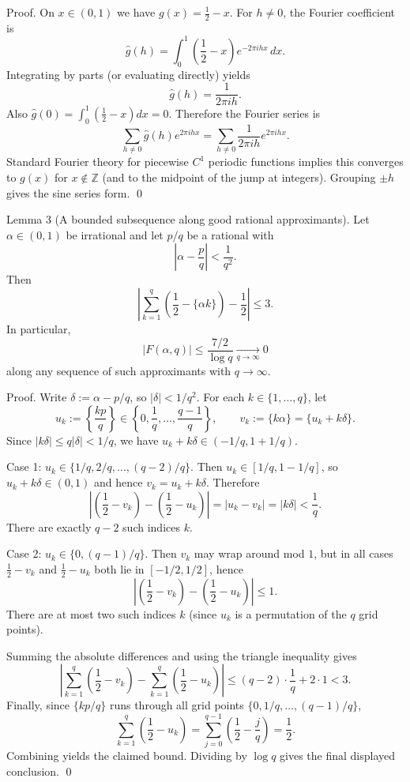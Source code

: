 Proof.
On $x\in(0,1)$ we have $g(x)=\frac12-x$.  For $h\neq 0$, the Fourier coefficient is
\[
\widehat g(h)=\int_0^1 \left(\frac12-x\right)e^{-2\pi i h x}\,dx.
\]
Integrating by parts (or evaluating directly) yields
\[
\widehat g(h)=\frac{1}{2\pi i h}.
\]
Also $\widehat g(0)=\int_0^1 (\frac12-x)dx=0$.  Therefore the Fourier series is
\[
\sum_{h\neq 0} \widehat g(h)e^{2\pi i h x} = \sum_{h\neq 0} \frac{1}{2\pi i h}e^{2\pi i h x}.
\]
Standard Fourier theory for piecewise $C^1$ periodic functions implies this converges to $g(x)$ for $x\notin\mathbb{Z}$ (and to the midpoint of the jump at integers).  Grouping $\pm h$ gives the sine series form. \qed

Lemma 3 (A bounded subsequence along good rational approximants).
Let $\alpha\in(0,1)$ be irrational and let $p/q$ be a rational with
\[
\left|\alpha-\frac{p}{q}\right| < \frac{1}{q^2}.
\]
Then
\[
\left|\sum_{k=1}^q \left(\frac12-\{\alpha k\}\right) - \frac12\right| \le 3.
\]
In particular,
\[
|F(\alpha,q)| \le \frac{7/2}{\log q}\xrightarrow[q\to\infty]{}0
\]
along any sequence of such approximants with $q\to\infty$.

Proof.
Write $\delta:=\alpha-p/q$, so $|\delta|<1/q^2$.  For each $k\in\{1,\dots,q\}$, let
\[
 u_k:=\left\{\frac{kp}{q}\right\}\in\left\{0,\frac1q,\dots,\frac{q-1}{q}\right\},
\qquad
 v_k:=\{k\alpha\}=\{u_k + k\delta\}.
\]
Since $|k\delta|\le q|\delta|<1/q$, we have $u_k+k\delta\in(-1/q,1+1/q)$.

Case 1: $u_k\in\{1/q,2/q,\dots,(q-2)/q\}$.  Then $u_k\in[1/q,1-1/q]$, so $u_k+k\delta\in(0,1)$ and hence $v_k=u_k+k\delta$.  Therefore
\[
\left|\left(\frac12-v_k\right)-\left(\frac12-u_k\right)\right| = |u_k-v_k| = |k\delta| < \frac{1}{q}.
\]
There are exactly $q-2$ such indices $k$.

Case 2: $u_k\in\{0,(q-1)/q\}$.  Then $v_k$ may wrap around mod $1$, but in all cases $\frac12-v_k$ and $\frac12-u_k$ both lie in $[-1/2,1/2]$, hence
\[
\left|\left(\frac12-v_k\right)-\left(\frac12-u_k\right)\right|\le 1.
\]
There are at most two such indices $k$ (since $u_k$ is a permutation of the $q$ grid points).

Summing the absolute differences and using the triangle inequality gives
\[
\left|\sum_{k=1}^q \left(\frac12-v_k\right) - \sum_{k=1}^q \left(\frac12-u_k\right)\right|
\le (q-2)\cdot \frac{1}{q} + 2\cdot 1 < 3.
\]
Finally, since $\{kp/q\}$ runs through all grid points $\{0,1/q,\dots,(q-1)/q\}$,
\[
\sum_{k=1}^q \left(\frac12-u_k\right)=\sum_{j=0}^{q-1}\left(\frac12-\frac{j}{q}\right)=\frac12.
\]
Combining yields the claimed bound.  Dividing by $\log q$ gives the final displayed conclusion. \qed


